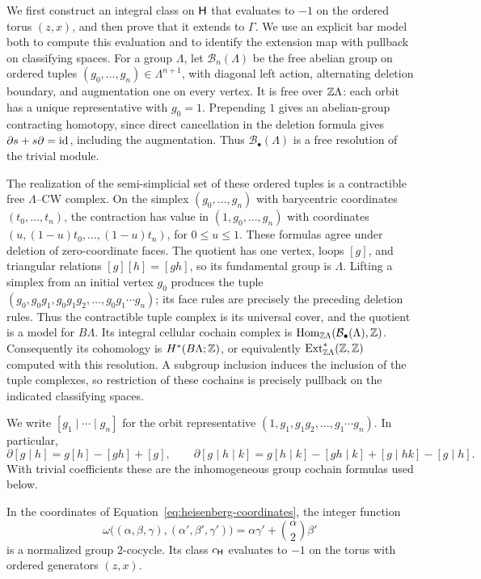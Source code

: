 We first construct an integral class on $\mathsf H$ that evaluates to $-1$ on
the ordered torus $(z,x)$, and then prove that it extends to $\Gamma$.
We use an explicit bar model both to compute this evaluation and to
identify the extension map with pullback on classifying spaces.
For a group $\Lambda$, let $\mathcal B_n(\Lambda)$ be
the free abelian group on ordered tuples
$(g_0,\ldots,g_n)\in\Lambda^{n+1}$, with diagonal left action,
alternating deletion boundary, and augmentation one on every
vertex.  It is free over $\mathbb Z\Lambda$: each orbit has a unique
representative with $g_0=1$.  Prepending $1$ gives an abelian-group
contracting homotopy, since direct cancellation in the deletion
formula gives $\partial s+s\partial=\mathrm{id}$, including the
augmentation.  Thus $\mathcal B_\bullet(\Lambda)$ is a free
resolution of the trivial module.

The realization of the semi-simplicial set of these ordered tuples
is a contractible free $\Lambda$--CW complex.  On the simplex
$(g_0,\ldots,g_n)$ with barycentric coordinates $(t_0,\ldots,t_n)$,
the contraction has value in $(1,g_0,\ldots,g_n)$ with coordinates
$(u,(1-u)t_0,\ldots,(1-u)t_n)$, for $0\leq u\leq1$.
These formulas agree under deletion of zero-coordinate faces.
The quotient has one vertex, loops $[g]$, and triangular relations
$[g][h]=[gh]$, so its fundamental group is $\Lambda$.  Lifting a
simplex from an initial vertex $g_0$ produces the tuple
$(g_0,g_0g_1,g_0g_1g_2,\ldots,g_0g_1\cdots g_n)$; its face rules
are precisely the preceding deletion rules.  Thus the contractible
tuple complex is its universal cover, and the quotient is a model
for $B\Lambda$.  Its integral cellular cochain complex is
$\operatorname{Hom}_{\mathbb Z\Lambda}(\mathcal B_\bullet(\Lambda),\mathbb Z)$.
Consequently its cohomology is $H^*(B\Lambda;\mathbb Z)$, or equivalently
$\operatorname{Ext}^*_{\mathbb Z\Lambda}(\mathbb Z,\mathbb Z)$ computed with this
resolution.  A subgroup inclusion induces the inclusion of the
tuple complexes, so restriction of these cochains is precisely
pullback on the indicated classifying spaces.

We write $[g_1\mid\cdots\mid g_n]$ for the orbit representative
$(1,g_1,g_1g_2,\ldots,g_1\cdots g_n)$.  In particular,
\[
 \partial[g\mid h]=g[h]-[gh]+[g],\qquad
 \partial[g\mid h\mid k]
 =g[h\mid k]-[gh\mid k]+[g\mid hk]-[g\mid h].
\]
With trivial coefficients these are the inhomogeneous group
cochain formulas used below.

\begin{lemma}
\label{lem:explicit-heisenberg-detector}
In the coordinates of Equation~\eqref{eq:heisenberg-coordinates},
the integer function
\begin{equation}
 \omega\bigl((\alpha,\beta,\gamma),
              (\alpha',\beta',\gamma')\bigr)
    =\alpha\gamma'+\binom{\alpha}{2}\beta'
 \label{eq:explicit-heisenberg-cocycle}
\end{equation}
is a normalized group $2$-cocycle.  Its class $c_{\mathsf H}$ evaluates
to $-1$ on the torus with ordered generators $(z,x)$.
\end{lemma}

